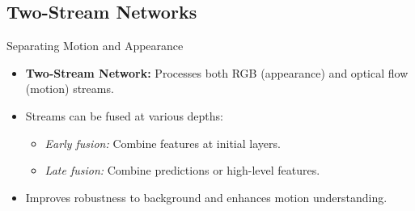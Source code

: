 \subsection{Two-Stream Networks}
\begin{frame}{Separating Motion and Appearance}
    \begin{itemize}
        \item \textbf{Two-Stream Network:} Processes both RGB (appearance) and optical flow (motion) streams.
        \item Streams can be fused at various depths:
        \begin{itemize}
            \item \textit{Early fusion:} Combine features at initial layers.
            \item \textit{Late fusion:} Combine predictions or high-level features.
        \end{itemize}
        \item Improves robustness to background and enhances motion understanding.
    \end{itemize}
\end{frame}

